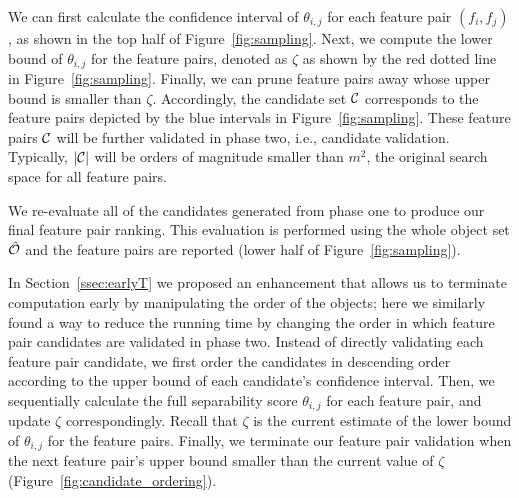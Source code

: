 We can first calculate the confidence interval of $\theta_{i,j}$ for each feature pair $(f_i,f_j)$, as shown in the top half of Figure~\ref{fig:sampling}. Next, we compute the lower bound of $\theta_{i,j}$ for the \topk feature pairs, denoted as $\zeta$ as shown by the red dotted line in Figure~\ref{fig:sampling}. Finally, we can prune feature pairs away whose upper bound is smaller than $\zeta$. Accordingly, the candidate set ${\mathcal{C}}$ corresponds to the feature pairs depicted by the blue intervals in Figure~\ref{fig:sampling}. These feature pairs ${\mathcal{C}}$ will be further validated in phase two, i.e., candidate validation. Typically, $|{\mathcal{C}}|$ will be orders of magnitude smaller than $m^2$, the original search space for all feature pairs.

We re-evaluate all of the candidates generated from phase one to produce our final feature pair ranking. This evaluation is performed using the whole object set $\hat{{\mathcal{O}}}$ and the \topk feature pairs are reported (lower half of Figure~\ref{fig:sampling}).

In Section~\ref{ssec:earlyT} we proposed an enhancement
that allows us to terminate computation early by
manipulating the order of the objects;
here we similarly found a way to reduce the running
time by changing the order in which feature pair candidates
are validated in phase two.
Instead of directly validating each feature pair candidate,
we first order the candidates in descending order according to the upper bound of each candidate's confidence interval.
Then, we sequentially calculate the full separability
score $\theta_{i,j}$ for each feature pair, and update $\zeta$ correspondingly.
Recall that $\zeta$ is the current estimate of the lower bound of $\theta_{i,j}$ for the \topk feature pairs. Finally, we terminate our feature
pair validation when the next feature pair's upper bound smaller than the current value of $\zeta$ (Figure~\ref{fig:candidate_ordering}).

